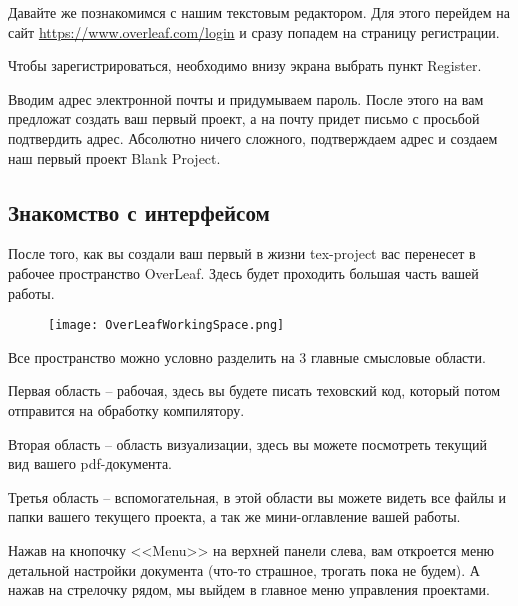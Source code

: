    Давайте же познакомимся с нашим текстовым редактором. Для этого перейдем на сайт 
    \href{https://www.overleaf.com/login}{https://www.overleaf.com/login} 
    и сразу попадем на страницу регистрации. 

    
    Чтобы зарегистрироваться, необходимо внизу экрана выбрать пункт Register.


    Вводим адрес электронной почты и придумываем пароль. После этого на вам предложат создать ваш первый проект, а на почту придет письмо с просьбой подтвердить адрес. Абсолютно ничего сложного,
    подтверждаем адрес и создаем наш первый проект Blank Project.


    \subsection{Знакомство с интерфейсом}

    После того, как вы создали ваш первый в жизни tex-project вас перенесет в рабочее пространство OverLeaf. Здесь будет
    проходить большая часть вашей работы.

    \begin{figure}[h!]
        \centering
        \texttt{[image: OverLeafWorkingSpace.png]}
        \caption{}
    \end{figure}

    Все пространство можно условно разделить на 3 главные смысловые области. 
    
    Первая область -- рабочая, здесь вы будете писать
    теховский код, который потом отправится на обработку компилятору. 
    
    Вторая область -- область визуализации, здесь вы
    можете посмотреть текущий вид вашего pdf-документа. 
    
    Третья область -- вспомогательная, в этой области вы можете видеть
    все файлы и папки вашего текущего проекта, а так же мини-оглавление вашей работы.


    Нажав на кнопочку <<Menu>> на верхней панели слева, вам откроется меню детальной настройки документа (что-то страшное, трогать пока не будем).
    А нажав на стрелочку рядом, мы выйдем в главное меню управления проектами.

